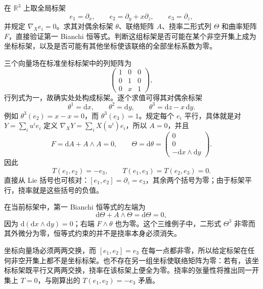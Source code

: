 \begin{exercise}\label{g1:ex:heisenberg-parallel-frame-torsion}
	在 \(\mathbb R^3\) 上取全局标架
	\[
		e_1=\partial_x,\qquad e_2=\partial_y+x\partial_z,\qquad e_3=\partial_z,
	\]
	并规定 \(\nabla_Xe_i=0\)。求其对偶余标架 \(\theta\)、联络矩阵 \(A\)、挠率二形式列 \(\Theta\) 和曲率矩阵 \(F\)，直接验证第一 Bianchi 恒等式。判断这组标架是否可能在某个非空开集上成为坐标标架，以及是否可能有其他坐标使该联络的全部坐标系数为零。
\end{exercise}
\begin{solution}
	三个向量场在标准坐标标架中的列矩阵为
	\[
		\begin{pmatrix}1&0&0\\0&1&0\\0&x&1\end{pmatrix},
	\]
	行列式为一，故确实处处构成标架。逐个求值可得其对偶余标架
	\[
		\theta^1=\mathrm{d}x,\qquad
		\theta^2=\mathrm{d}y,\qquad
		\theta^3=\mathrm{d}z-x\,\mathrm{d}y.
	\]
	例如 \(\theta^3(e_2)=x-x=0\)，而 \(\theta^3(e_3)=1\)。规定每个 \(e_i\) 平行，具体就是对 \(Y=\sum_i u^i e_i\) 定义 \(\nabla_XY=\sum_iX(u^i)e_i\)，所以 \(A=0\)，并且
	\[
		F=\mathrm{d}A+A\wedge A=0,\qquad
		\Theta=\mathrm{d}\theta
		=\begin{pmatrix}0\\0\\-\mathrm{d}x\wedge\mathrm{d}y\end{pmatrix}.
	\]
	因此
	\[
		T(e_1,e_2)=-e_3,\qquad T(e_1,e_3)=T(e_2,e_3)=0.
	\]
	直接从 Lie 括号也可核对：\([e_1,e_2]=\partial_z=e_3\)，其余两个括号为零；由于标架平行，挠率就是这些括号的负值。

	在当前标架中，第一 Bianchi 恒等式的左端为
	\[
		\mathrm{d}\Theta+A\wedge\Theta=\mathrm{d}\Theta=0,
	\]
	因为 \(\mathrm{d}(\mathrm{d}x\wedge\mathrm{d}y)=0\)；右端 \(F\wedge\theta\) 也为零。这个三维例子中，二形式 \(\Theta^3\) 非零而其外微分为零，恒等式约束的并不是挠率本身必须消失。

	坐标向量场必须两两交换，而 \([e_1,e_2]=e_3\) 在每一点都非零，所以给定标架在任何非空开集上都不是坐标标架。也不存在另一组坐标使联络矩阵为零：若有，该坐标标架既平行又两两交换，挠率在该标架上便全为零。挠率的张量性将推出同一开集上 \(T=0\)，与刚算出的 \(T(e_1,e_2)=-e_3\) 矛盾。
\end{solution}

